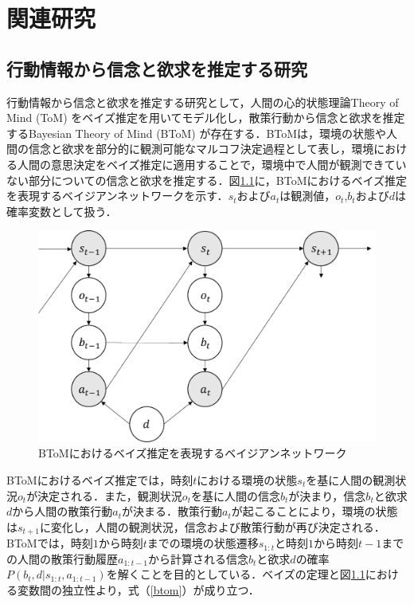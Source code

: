 \chapter{関連研究}

\section{行動情報から信念と欲求を推定する研究}
\par
行動情報から信念と欲求を推定する研究として，人間の心的状態理論Theory of Mind (ToM) \cite{子安増生1997心の理論}をベイズ推定を用いてモデル化し，散策行動から信念と欲求を推定するBayesian Theory of Mind (BToM) \cite{baker2011bayesian}が存在する．BToMは，環境の状態や人間の信念と欲求を部分的に観測可能なマルコフ決定過程\cite{alma9926438829904034}として表し，環境における人間の意思決定をベイズ推定に適用することで，環境中で人間が観測できていない部分についての信念と欲求を推定する．図\ref{fig:btom}に，BToMにおけるベイズ推定を表現するベイジアンネットワーク\cite{alma9926301926204034}を示す．$s_t$および$a_t$は観測値，$o_t$,$b_t$および$d$は確率変数として扱う．
\begin{figure}[htbp]
  \begin{center}
    \includegraphics[scale=0.7]{./btom.pdf}
    \caption{BToMにおけるベイズ推定を表現するベイジアンネットワーク}
    \label{fig:btom}
  \end{center}
\end{figure}
BToMにおけるベイズ推定では，時刻$t$における環境の状態$s_{t}$を基に人間の観測状況$o_{t}$が決定される．また，観測状況$o_{t}$を基に人間の信念$b_{t}$が決まり，信念$b_{t}$と欲求$d$から人間の散策行動$a_{t}$が決まる．散策行動$a_{t}$が起こることにより，環境の状態は$s_{t+1}$に変化し，人間の観測状況，信念および散策行動が再び決定される．BToMでは，時刻$1$から時刻$t$までの環境の状態遷移$s_{1:t}$と時刻$1$から時刻$t-1$までの人間の散策行動履歴$a_{1:t-1}$から計算される信念$b_t$と欲求$d$の確率$P(b_t,d|s_{1:t},a_{1:t-1})$を解くことを目的としている．ベイズの定理\cite{ベイズ}と図\ref{fig:btom}における変数間の独立性\cite{ベイズ}より，式（\ref{btom}）が成り立つ．
